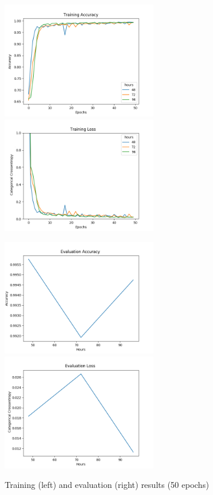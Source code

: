 \begin{figure}
      \begin{multicols}{2}
            \includegraphics[height=5cm]{img/control_condition/plot_acc_train_50e.png}
            \includegraphics[height=5cm]{img/control_condition/plot_loss_train_50e.png}

            \includegraphics[height=5cm]{img/control_condition/plot_acc_eval_50e.png}
            \includegraphics[height=5cm]{img/control_condition/plot_loss_eval_50e.png}
      \end{multicols}
      \caption{Training (left) and evaluation (right) results (50 epochs)}
      \label{figure:control_condition_50e}
\end{figure}


